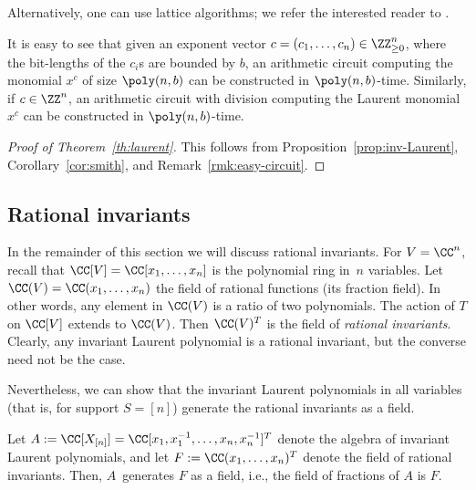 Alternatively, one can use lattice algorithms; we refer the interested reader to \cite[Corollary~5.4.10]{GLS-book}.

\begin{remark}\label{rmk:easy-circuit}
It is easy to see that given an exponent vector $c = (c_1,\dots,c_n) \in \ZZ_{\ge 0}^n$, where the bit-lengths of the $c_i$s are bounded by $b$, an arithmetic circuit computing the monomial $x^c$ of size $\poly(n,b)$ can be constructed in $\poly(n,b)$-time.
Similarly, if $c\in \ZZ^n$, an arithmetic circuit with division computing the Laurent monomial $x^c$ can be constructed in $\poly(n,b)$-time.
\end{remark}

\begin{proof}[Proof of Theorem~\ref{th:laurent}]
This follows from Proposition~\ref{prop:inv-Laurent}, Corollary~\ref{cor:smith}, and Remark~\ref{rmk:easy-circuit}.
\end{proof}

%
\subsection{Rational invariants}\label{se:rational}
%
In the remainder of this section we will discuss rational invariants.
For $V = \CC^n$, recall that $\CC[V] = \CC[x_1,\dots,x_n]$ is the polynomial ring in~$n$ variables.
Let $\CC(V) = \CC(x_1,\dots,x_n)$ the field of rational functions (its fraction field).
In other words, any element in $\CC(V)$ is a ratio of two polynomials.
The action of $T$ on $\CC[V]$ extends to $\CC(V)$.
Then $\CC(V)^T$ is the field of \emph{rational invariants}.
Clearly, any invariant Laurent polynomial is a rational invariant, but the converse need not be the case.

Nevertheless, we can show that the invariant Laurent polynomials in all variables (that is, for support $S=[n]$) generate the rational invariants as a field.

\begin{proposition}\label{pro:rat}
Let $A := \CC[X_{[n]}] = \CC[x_1,x_1^{-1},\dots,x_n,x_n^{-1}]^T$ denote the algebra of invariant Laurent polynomials,
and let $F := \CC(x_1,\dots,x_n)^T$ denote the field of rational invariants.
Then, $A$~generates $F$ as a field, i.e., the field of fractions of $A$ is $F$.
\end{proposition}

